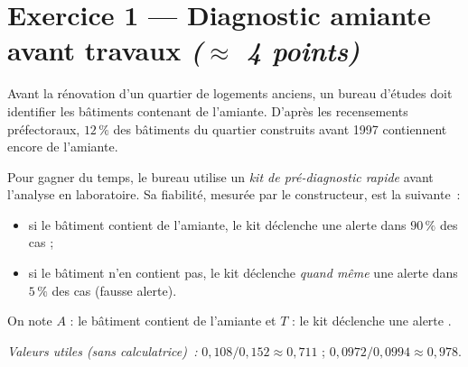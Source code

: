 \vspace{0.5em}

\bigskip

\section*{Exercice 1 --- Diagnostic amiante avant travaux \hfill {\normalfont \itshape ($\approx$ 4 points)}}

Avant la rénovation d'un quartier de logements anciens, un bureau d'études doit identifier les bâtiments contenant de l'amiante. D'après les recensements préfectoraux, $12\,\%$ des bâtiments du quartier construits avant 1997 contiennent encore de l'amiante.

Pour gagner du temps, le bureau utilise un \emph{kit de pré-diagnostic rapide} avant l'analyse en laboratoire. Sa fiabilité, mesurée par le constructeur, est la suivante~:
\begin{itemize}\setlength{\itemsep}{0.1em}
  \item si le bâtiment contient de l'amiante, le kit déclenche une alerte dans $90\,\%$ des cas ;
  \item si le bâtiment n'en contient pas, le kit déclenche \emph{quand même} une alerte dans $5\,\%$ des cas (fausse alerte).
\end{itemize}

On note $A$ : \og le bâtiment contient de l'amiante \fg{} et $T$ : \og le kit déclenche une alerte \fg.

\smallskip

\textit{Valeurs utiles (sans calculatrice)~:} \quad $0{,}108 / 0{,}152 \approx 0{,}711$ \quad ; \quad $0{,}0972 / 0{,}0994 \approx 0{,}978$.

